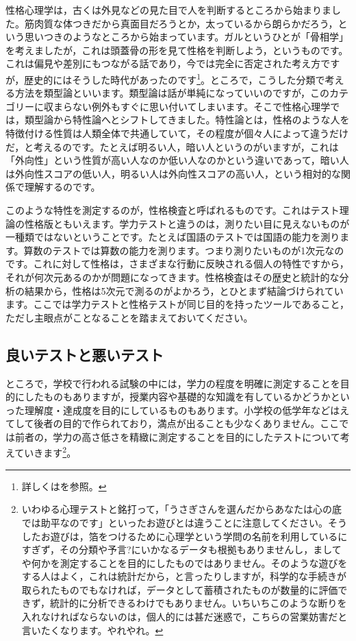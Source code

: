 \documentclass{ltjbook}
\begin{document}
性格心理学は，古くは外見などの見た目で人を判断するところから始まりました。筋肉質な体つきだから真面目だろうとか，太っているから朗らかだろう，という思いつきのようなところから始まっています。ガルというひとが「骨相学」を考えましたが，これは頭蓋骨の形を見て性格を判断しよう，というものです。これは偏見や差別にもつながる話であり，今では完全に否定された考え方ですが，歴史的にはそうした時代があったのです\footnote{詳しくは\textcite{Watanabe2019}を参照。}。ところで，こうした分類で考える方法を類型論といいます。類型論は話が単純になっていいのですが，このカテゴリーに収まらない例外もすぐに思い付いてしまいます。そこで性格心理学では，類型論から特性論へとシフトしてきました。特性論とは，性格のような人を特徴付ける性質は人類全体で共通していて，その程度が個々人によって違うだけだ，と考えるのです。たとえば明るい人，暗い人というのがいますが，これは「外向性」という性質が高い人なのか低い人なのかという違いであって，暗い人は外向性スコアの低い人，明るい人は外向性スコアの高い人，という相対的な関係で理解するのです\parencite{Oshio2020}。

このような特性を測定するのが，性格検査と呼ばれるものです。これはテスト理論の性格版ともいえます。学力テストと違うのは，測りたい目に見えないものが一種類ではないということです。たとえば国語のテストでは国語の能力を測ります。算数のテストでは算数の能力を測ります。つまり測りたいものが1次元なのです。これに対して性格は，さまざまな行動に反映される個人の特性ですから，それが何次元あるのかが問題になってきます。性格検査はその歴史と統計的な分析の結果から，性格は5次元で測るのがよかろう，とひとまず結論づけられています。ここでは学力テストと性格テストが同じ目的を持ったツールであること，ただし主眼点がことなることを踏まえておいてください。

\subsection{良いテストと悪いテスト}
ところで，学校で行われる試験の中には，学力の程度を明確に測定することを目的にしたものもありますが，授業内容や基礎的な知識を有しているかどうかといった理解度・達成度を目的にしているものもあります。小学校の低学年などはえてして後者の目的で作られており，満点が出ることも少なくありません。ここでは前者の，学力の高さ低さを精緻に測定することを目的にしたテストについて考えていきます\footnote{いわゆる心理テストと銘打って，「うさぎさんを選んだからあなたは心の底では助平なのです」といったお遊びとは違うことに注意してください。そうしたお遊びは，箔をつけるために心理学という学問の名前を利用しているにすぎず，その分類や予言?にいかなるデータも根拠もありませんし，ましてや何かを測定することを目的にしたものではありません。そのような遊びをする人はよく，これは統計だから，と言ったりしますが，科学的な手続きが取られたものでもなければ，データとして蓄積されたものが数量的に評価できず，統計的に分析できるわけでもありません。いちいちこのような断りを入れなければならないのは，個人的には甚だ迷惑で，こちらの営業妨害だと言いたくなります。やれやれ。}。
\end{document}
